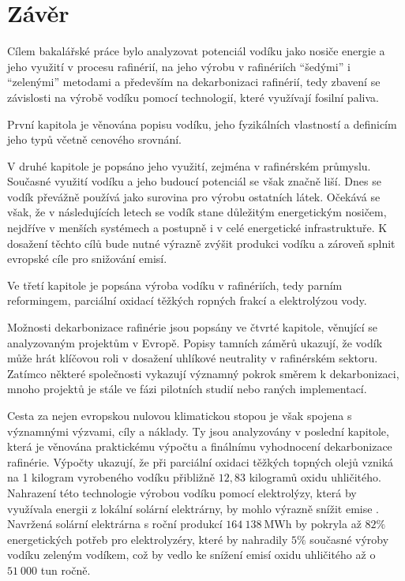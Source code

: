 \chapter*{Závěr}

Cílem bakalářské práce bylo analyzovat potenciál vodíku jako nosiče energie a jeho využití v procesu rafinérií, na jeho výrobu v rafinériích \enquote{šedými} i \enquote{zelenými} metodami a především na dekarbonizaci rafinérií, tedy zbavení se závislosti na výrobě vodíku pomocí technologií, které využívají fosilní paliva.

První kapitola je věnována popisu vodíku, jeho fyzikálních vlastností a definicím jeho typů včetně cenového srovnání. 

V druhé kapitole je popsáno jeho využití, zejména v rafinérském průmyslu. Současné využití vodíku a jeho budoucí potenciál se však značně liší. Dnes se vodík převážně používá jako surovina pro výrobu ostatních látek. Očekává se však, že v následujících letech se vodík stane důležitým energetickým nosičem, nejdříve v menších systémech a postupně i v celé energetické infrastruktuře. K dosažení těchto cílů bude nutné výrazně zvýšit produkci vodíku a zároveň splnit evropské cíle pro snižování emisí. \cite{Tkac2017} 

Ve třetí kapitole je popsána výroba vodíku v rafinériích, tedy parním reformingem, parciální oxidací těžkých ropných frakcí a elektrolýzou vody. 

Možnosti dekarbonizace rafinérie jsou popsány ve čtvrté kapitole, věnující se analyzovaným projektům v Evropě. Popisy tamních záměrů ukazují, že vodík může hrát klíčovou roli v dosažení uhlíkové neutrality v rafinérském sektoru. Zatímco některé společnosti vykazují významný pokrok směrem k dekarbonizaci, mnoho projektů je stále ve fázi pilotních studií nebo raných implementací.

Cesta za nejen evropskou nulovou klimatickou stopou je však spojena s významnými výzvami, cíly a náklady. Ty jsou analyzovány v poslední kapitole, která je věnována praktickému výpočtu a finálnímu vyhodnocení dekarbonizace rafinérie. Výpočty ukazují, že při parciální oxidaci těžkých topných olejů vzniká na 1 kilogram vyrobeného vodíku přibližně $12,83$ kilogramů oxidu uhličitého. Nahrazení této technologie výrobou vodíku pomocí elektrolýzy, která by využívala energii z lokální solární elektrárny, by mohlo výrazně snížit emise . Navržená solární elektrárna s roční produkcí $164\ 138\ \mathrm{MWh}$ by pokryla až $82\%$ energetických potřeb pro elektrolyzéry, které by nahradily $5\%$ současné výroby vodíku zeleným vodíkem, což by vedlo ke snížení emisí oxidu uhličitého až o $51\ 000$ tun ročně.